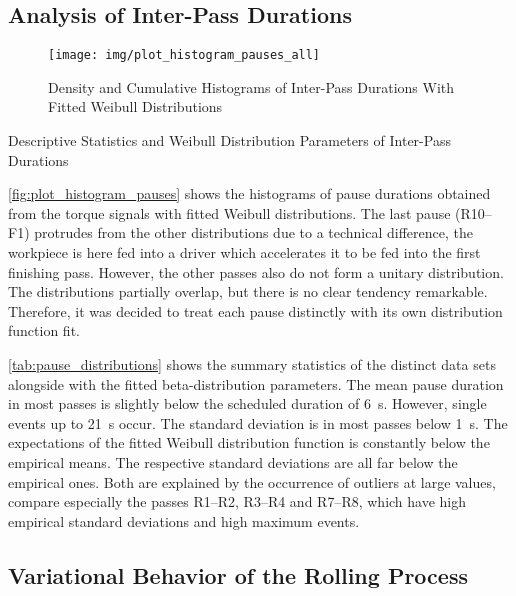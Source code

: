 \subsection{Analysis of Inter-Pass Durations}\label{subsec:analysis-of-inter-pass-durations}

\begin{figure}
    \centering
    \texttt{[image: img/plot\_histogram\_pauses\_all]}
    \caption{Density and Cumulative Histograms of Inter-Pass Durations With Fitted Weibull Distributions}
    \label{fig:plot_histogram_pauses}
\end{figure}

\begin{table}
    \centering
    \caption{Descriptive Statistics and Weibull Distribution Parameters of Inter-Pass Durations}
    \label{tab:pause_distributions}
    
\end{table}


\autoref{fig:plot_histogram_pauses} shows the histograms of pause durations obtained from the torque signals with fitted Weibull distributions.
The last pause (R10--F1) protrudes from the other distributions due to a technical difference, the workpiece is here fed into a driver which accelerates it to be fed into the first finishing pass.
However, the other passes also do not form a unitary distribution.
The distributions partially overlap, but there is no clear tendency remarkable.
Therefore, it was decided to treat each pause distinctly with its own distribution function fit.

\autoref{tab:pause_distributions} shows the summary statistics of the distinct data sets alongside with the fitted beta-distribution parameters.
The mean pause duration in most passes is slightly below the scheduled duration of \qty{6}{\second}.
However, single events up to \qty{21}{\second} occur.
The standard deviation is in most passes below \qty{1}{\second}.
The expectations of the fitted Weibull distribution function is constantly below the empirical means.
The respective standard deviations are all far below the empirical ones.
Both are explained by the occurrence of outliers at large values, compare especially the passes R1--R2, R3--R4 and R7--R8, which have high empirical standard deviations and high maximum events.

\subsection{Variational Behavior of the Rolling Process}\label{subsec:variational-behavior-of-the-rolling-process}

